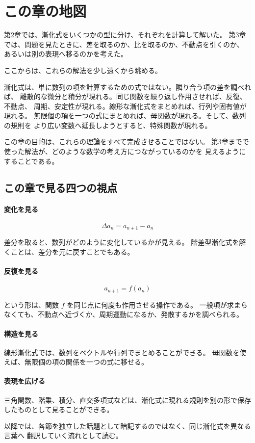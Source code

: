 
\section*{この章の地図}

第2章では、漸化式をいくつかの型に分け、それぞれを計算して解いた。
第3章では、問題を見たときに、差を取るのか、比を取るのか、不動点を引くのか、
あるいは別の表現へ移るのかを考えた。

ここからは、これらの解法を少し遠くから眺める。

漸化式は、単に数列の項を計算するための式ではない。隣り合う項の差を調べれば、
離散的な微分と積分が現れる。同じ関数を繰り返し作用させれば、反復、不動点、
周期、安定性が現れる。線形な漸化式をまとめれば、行列や固有値が現れる。
無限個の項を一つの式にまとめれば、母関数が現れる。そして、数列の規則を
より広い変数へ延長しようとすると、特殊関数が現れる。

この章の目的は、これらの理論をすべて完成させることではない。
第3章までで使った解法が、どのような数学の考え方につながっているのかを
見えるようにすることである。

\subsection*{この章で見る四つの視点}

\paragraph{変化を見る}

\[
  \Delta a_n=a_{n+1}-a_n
\]

差分を取ると、数列がどのように変化しているかが見える。
階差型漸化式を解くことは、差分を元に戻すことでもある。

\paragraph{反復を見る}

\[
  a_{n+1}=f(a_n)
\]

という形は、関数 $f$ を同じ点に何度も作用させる操作である。
一般項が求まらなくても、不動点へ近づくか、周期運動になるか、発散するかを調べられる。

\paragraph{構造を見る}

線形漸化式では、数列をベクトルや行列でまとめることができる。
母関数を使えば、無限個の項の関係を一つの式に移せる。

\paragraph{表現を広げる}

三角関数、階乗、積分、直交多項式などは、漸化式に現れる規則を別の形で保存したものとして見ることができる。

以降では、各節を独立した話題として暗記するのではなく、同じ漸化式を異なる言葉へ
翻訳していく流れとして読む。
